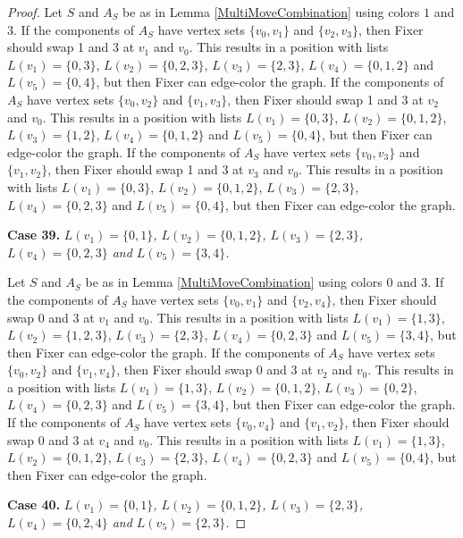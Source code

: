 \documentclass[12pt]{amsart}
\theoremstyle{plain}
\theoremstyle{definition}
\theoremstyle{remark}
\begin{document}
\begin{proof}
Let $S$ and $A_S$ be as in Lemma \ref{MultiMoveCombination} using colors $1$ and $3$. If the components of $A_S$ have vertex sets $\{v_0, v_1\}$ and $\{v_2, v_3\}$, then Fixer should swap 1 and 3 at $v_1$ and $v_0$. This results in a position with lists $L(v_1) = \{0, 3\}$, $L(v_2) = \{0, 2, 3\}$, $L(v_3) = \{2, 3\}$, $L(v_4) = \{0, 1, 2\}$ and $L(v_5) = \{0, 4\}$, but then Fixer can edge-color the graph.
If the components of $A_S$ have vertex sets $\{v_0, v_2\}$ and $\{v_1, v_3\}$, then Fixer should swap 1 and 3 at $v_2$ and $v_0$. This results in a position with lists $L(v_1) = \{0, 3\}$, $L(v_2) = \{0, 1, 2\}$, $L(v_3) = \{1, 2\}$, $L(v_4) = \{0, 1, 2\}$ and $L(v_5) = \{0, 4\}$, but then Fixer can edge-color the graph.
If the components of $A_S$ have vertex sets $\{v_0, v_3\}$ and $\{v_1, v_2\}$, then Fixer should swap 1 and 3 at $v_3$ and $v_0$. This results in a position with lists $L(v_1) = \{0, 3\}$, $L(v_2) = \{0, 1, 2\}$, $L(v_3) = \{2, 3\}$, $L(v_4) = \{0, 2, 3\}$ and $L(v_5) = \{0, 4\}$, but then Fixer can edge-color the graph.

\noindent\textbf{Case 39.  }\textit{$L(v_1) = \{0, 1\}$, $L(v_2) = \{0, 1, 2\}$, $L(v_3) = \{2, 3\}$, $L(v_4) = \{0, 2, 3\}$ and $L(v_5) = \{3, 4\}$.}

Let $S$ and $A_S$ be as in Lemma \ref{MultiMoveCombination} using colors $0$ and $3$. If the components of $A_S$ have vertex sets $\{v_0, v_1\}$ and $\{v_2, v_4\}$, then Fixer should swap 0 and 3 at $v_1$ and $v_0$. This results in a position with lists $L(v_1) = \{1, 3\}$, $L(v_2) = \{1, 2, 3\}$, $L(v_3) = \{2, 3\}$, $L(v_4) = \{0, 2, 3\}$ and $L(v_5) = \{3, 4\}$, but then Fixer can edge-color the graph.
If the components of $A_S$ have vertex sets $\{v_0, v_2\}$ and $\{v_1, v_4\}$, then Fixer should swap 0 and 3 at $v_2$ and $v_0$. This results in a position with lists $L(v_1) = \{1, 3\}$, $L(v_2) = \{0, 1, 2\}$, $L(v_3) = \{0, 2\}$, $L(v_4) = \{0, 2, 3\}$ and $L(v_5) = \{3, 4\}$, but then Fixer can edge-color the graph.
If the components of $A_S$ have vertex sets $\{v_0, v_4\}$ and $\{v_1, v_2\}$, then Fixer should swap 0 and 3 at $v_4$ and $v_0$. This results in a position with lists $L(v_1) = \{1, 3\}$, $L(v_2) = \{0, 1, 2\}$, $L(v_3) = \{2, 3\}$, $L(v_4) = \{0, 2, 3\}$ and $L(v_5) = \{0, 4\}$, but then Fixer can edge-color the graph.

\noindent\textbf{Case 40.  }\textit{$L(v_1) = \{0, 1\}$, $L(v_2) = \{0, 1, 2\}$, $L(v_3) = \{2, 3\}$, $L(v_4) = \{0, 2, 4\}$ and $L(v_5) = \{2, 3\}$.}


\end{proof}
\end{document}
